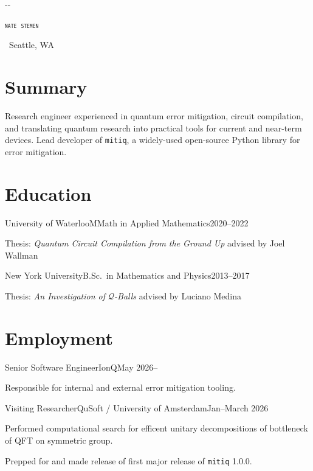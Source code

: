 \documentclass{cultvoucher}
\begin{document}
\begin{adjustwidth}{\dimexpr-\marginparsep-\marginparwidth}{}
	\begin{center}
		\textsc{\texttt{\HUGE nate stemen}}

		 \separator{}\, Seattle, WA
	\end{center}
\end{adjustwidth}

\section{Summary}
\hfill\break
Research engineer experienced in quantum error mitigation, circuit compilation, and translating quantum research into practical tools for current and near-term devices.
Lead developer of \texttt{mitiq}, a widely-used open-source Python library for error mitigation.

\section{Education}

\begin{entry}{University of Waterloo}{MMath in Applied Mathematics}{2020--2022}
	\item Thesis: \textit{Quantum Circuit Compilation from the Ground Up} advised by Joel Wallman
\end{entry}

\begin{entry}{New York University}{B.Sc.\ in Mathematics and Physics}{2013--2017}
	\item Thesis: \textit{An Investigation of $\mathcal{Q}$-Balls} advised by Luciano Medina
\end{entry}

\section{Employment}

\begin{entry}{Senior Software Engineer}{IonQ}{May 2026--}
	\item Responsible for internal and external error mitigation tooling.
\end{entry}

\begin{entry}{Visiting Researcher}{QuSoft / University of Amsterdam}{Jan--March 2026}
	\item Performed computational search for efficent unitary decompositions of bottleneck of QFT on symmetric group.
	\item Prepped for and made release of first major release of \texttt{mitiq} 1.0.0.
\end{entry}
\end{document}
